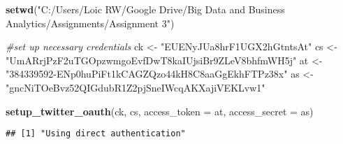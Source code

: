 \documentclass[]{article}
\newenvironment{Shaded}{\begin{snugshade}}{\end{snugshade}}
\newcommand{\KeywordTok}[1]{\textcolor[rgb]{0.13,0.29,0.53}{\textbf{#1}}}
\newcommand{\DataTypeTok}[1]{\textcolor[rgb]{0.13,0.29,0.53}{#1}}
\newcommand{\StringTok}[1]{\textcolor[rgb]{0.31,0.60,0.02}{#1}}
\newcommand{\CommentTok}[1]{\textcolor[rgb]{0.56,0.35,0.01}{\textit{#1}}}
\newcommand{\NormalTok}[1]{#1}
\begin{document}
\begin{Shaded}
\begin{Highlighting}[]
\KeywordTok{setwd}\NormalTok{(}\StringTok{"C:/Users/Loic RW/Google Drive/Big Data and Business Analytics/Assignments/Assignment 3"}\NormalTok{)}

\CommentTok{#set up necessary credentials}
\NormalTok{ck <-}\StringTok{ "EUENyJUa8hrF1UGX2hGtntsAt"}
\NormalTok{cs <-}\StringTok{ "UmARrjPzF2uTGOpzwmgoEvfDwT8kaIUjsiBr9ZLeV8bhfmWH5j"}
\NormalTok{at <-}\StringTok{ "384339592-ENp0huPiFt1kCAGZQzo44kH8C8aaGgEkhFTPz38x"}
\NormalTok{as <-}\StringTok{ "gncNiTOeBvz52QIGdubR1Z2pjSneIWcqAKXajiVEKLvw1"}

\KeywordTok{setup_twitter_oauth}\NormalTok{(ck, cs, }\DataTypeTok{access_token =}\NormalTok{ at, }\DataTypeTok{access_secret =}\NormalTok{ as)}
\end{Highlighting}
\end{Shaded}

\begin{verbatim}
## [1] "Using direct authentication"
\end{verbatim}
\end{document}
